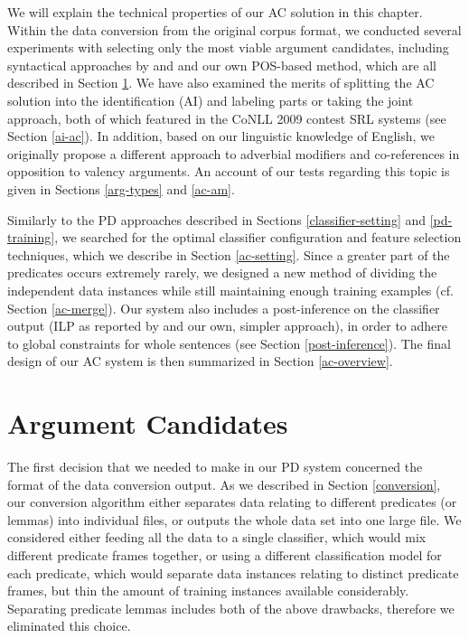 \documentclass[12pt,notitlepage]{report}
\begin{document}
We will explain the technical properties of our AC solution in this chapter. Within the data conversion from the original corpus format, we conducted several experiments with selecting only the most viable argument candidates, including syntactical approaches by \citet{zhao09} and \citet{asahara09} and our own POS-based method, which are all described in Section \ref{pruning}. We have also examined the merits of splitting the AC solution into the identification (AI) and labeling parts or taking the joint approach, both of which featured in the CoNLL 2009 contest SRL systems (see Section \ref{ai-ac}). In addition, based on our linguistic knowledge of English, we originally propose a different approach to adverbial modifiers and co-references in opposition to valency arguments. An account of our tests regarding this topic is given in Sections \ref{arg-types} and \ref{ac-am}. 

Similarly to the PD approaches described in Sections \ref{classifier-setting} and \ref{pd-training}, we searched for the optimal classifier configuration and feature selection techniques, which we describe in Section \ref{ac-setting}. Since a greater part of the predicates occurs extremely rarely, we designed a new method of dividing the independent data instances while still maintaining enough training examples (cf. Section \ref{ac-merge}). Our system also includes a post-inference on the classifier output (ILP as reported by \citet{punyakanok04} and our own, simpler approach), in order to adhere to global constraints for whole sentences (see Section \ref{post-inference}). The final design of our AC system is then summarized in Section \ref{ac-overview}.

\section{Argument Candidates}\label{pruning}

The first decision that we needed to make in our PD system concerned the format of the data conversion output. As we described in Section \ref{conversion}, our conversion algorithm either separates data relating to different predicates (or lemmas) into individual files, or outputs the whole data set into one large file. We considered either feeding all the data to a single classifier, which would mix different predicate frames together, or using a different classification model for each predicate, which would separate data instances relating to distinct predicate frames, but thin the amount of training instances available considerably. Separating predicate lemmas includes both of the above drawbacks, therefore we eliminated this choice.
\end{document}
